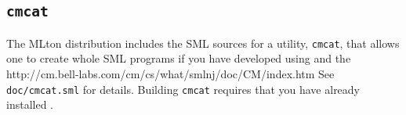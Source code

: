 
\subsection{{\tt cmcat}}

The MLton distribution includes the SML sources for a utility,
{\tt cmcat}, that allows one to create whole SML programs if you
have developed using {\smlnj} and the 
		  {http://cm.bell-labs.com/cm/cs/what/smlnj/doc/CM/index.htm}
See {\tt doc/cmcat.sml} for details.  Building {\tt cmcat}
requires that you have already installed {\smlnj}.
